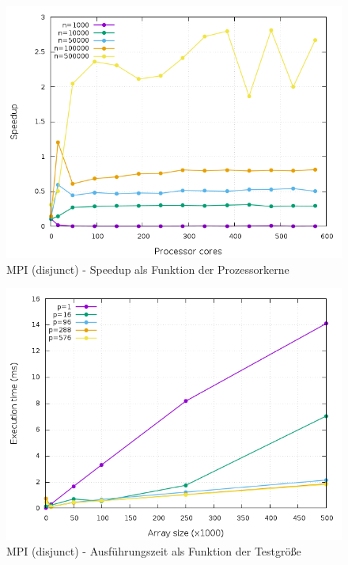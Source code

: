 \begin{figure}[p]
	\centering
	\includegraphics[width=404pt]{resources/plots/MPI_Disjunct_sizes.png}
	\caption{MPI (disjunct) - Speedup als Funktion der Prozessorkerne}
	\label{MPI_Disjunct_sizes}
\end{figure}

\begin{figure}[p]
	\centering
	\includegraphics[width=404pt]{resources/plots/MPI_Disjunct_cores.png}
	\caption{MPI (disjunct) - Ausführungszeit als Funktion der Testgröße}
	\label{MPI_Disjunct_cores}
\end{figure}


